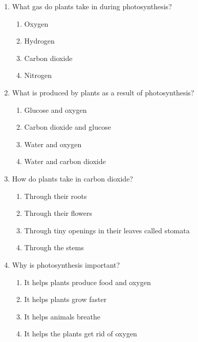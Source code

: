 \documentclass[12pt]{article}
\begin{document}
\begin{enumerate}
    \vspace{0.5cm}

    \item What gas do plants take in during photosynthesis?

    \begin{enumerate}[label=\Alph*.]
        \item Oxygen
        \item Hydrogen
        \item Carbon dioxide
        \item Nitrogen
    \end{enumerate}
    
    \vspace{0.5cm}

    \item What is produced by plants as a result of photosynthesis?

    \begin{enumerate}[label=\Alph*.]
        \item Glucose and oxygen
        \item Carbon dioxide and glucose
        \item Water and oxygen
        \item Water and carbon dioxide
    \end{enumerate}
    
    \vspace{0.5cm}

    \item How do plants take in carbon dioxide?

    \begin{enumerate}[label=\Alph*.]
        \item Through their roots
        \item Through their flowers
        \item Through tiny openings in their leaves called stomata
        \item Through the stems
    \end{enumerate}
    
    \vspace{0.5cm}

    \item Why is photosynthesis important?

    \begin{enumerate}[label=\Alph*.]
        \item It helps plants produce food and oxygen
        \item It helps plants grow faster
        \item It helps animals breathe
        \item It helps the plants get rid of oxygen
    \end{enumerate}
    

\end{enumerate}
\end{document}
